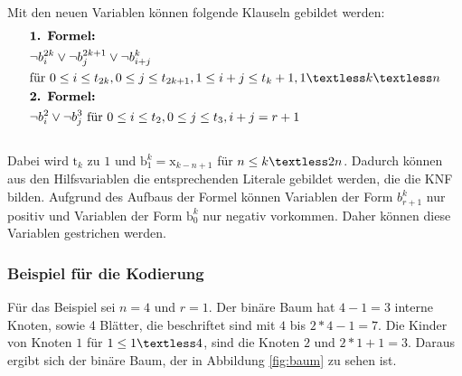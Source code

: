 \documentclass[a4,abstract=on]{scrartcl}
\begin{document}
Mit den neuen Variablen können folgende Klauseln gebildet werden:\\
\begin{align*}
&\textbf{1. Formel:}\\
&\neg b_i^{2k} \vee \neg b_j^{2k+1} \vee \neg b_{i+j}^{k} \\
&\text{für} {~} 0\leq i \leq t_{2k}, 0\leq j \leq t_{2k+1}, 1\leq i+j \leq t_{k}+1, 1\textless k \textless n\\
&\textbf{2. Formel:}\\
&\neg b_i^2 \vee \neg b_j^3 {~} \text{für} {~} 0\leq i \leq t_2, 0\leq j \leq t_3, i+j = r+1\\
\end{align*}
\ \\
Dabei wird $\text{t}_k$ zu $1$ und $\text{b}_1^k = \text{x}_{k-n+1}$ für $n \leq k \textless 2n$. Dadurch können aus den Hilfsvariablen die entsprechenden Literale gebildet werden, die die KNF bilden.
Aufgrund des Aufbaus der Formel können Variablen der Form $b_{r+1}^k$ nur positiv und Variablen der Form $\text{b}_0^k$ nur negativ vorkommen. Daher können diese Variablen gestrichen werden.

\subsubsection*{Beispiel für die Kodierung}
Für das Beispiel sei $n=4$ und $r =1$. Der binäre Baum hat $4-1 = 3$ interne Knoten, sowie 4 Blätter, die beschriftet sind mit $4$ bis $2*4-1=7$. Die Kinder von Knoten $1$  für $1 \leq 1 \textless 4$, sind die Knoten $2$ und $2*1 +1=3$. Daraus ergibt sich der binäre Baum, der in Abbildung \ref{fig:baum} zu sehen ist.
\end{document}
